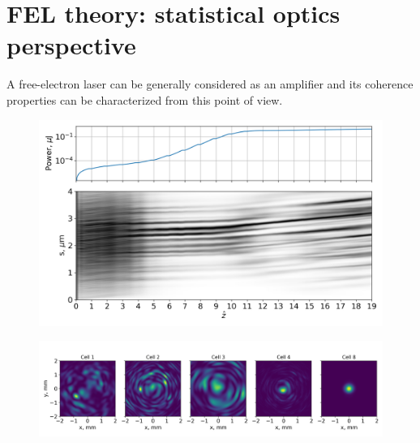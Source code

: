 \chapter{FEL theory: statistical optics perspective}
\label{chapter:FEL theory}


A free-electron laser can be generally considered as an amplifier and its coherence properties can be characterized from this point of view. 

\begin{figure}[h!]
	\centering
    \includegraphics[width=0.95\linewidth]{content/images/4_FEL_Theory/evo_spikes.png}
\captionsetup{justification=centering}
    \caption{}
    \label{fig:pole}
\end{figure}

\begin{figure}[h!]
	\centering
    \includegraphics[width=1.1\linewidth]{content/images/4_FEL_Theory/transverse_modes.png}
    \captionsetup{justification=centering}
    \caption{}
    \label{fig:pole}
\end{figure}
\\

